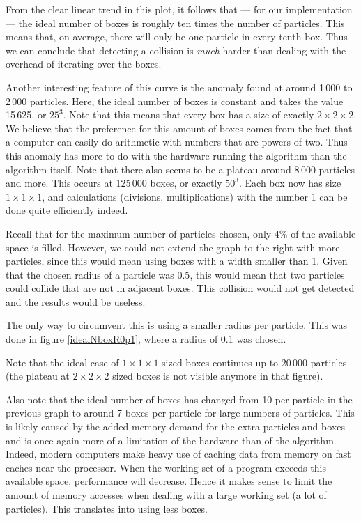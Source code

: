 From the clear linear trend in this plot, it follows that --- for our 
implementation  --- the ideal number of boxes is roughly ten times the 
number of particles. This means that, on average, there will only be one 
particle in every tenth box. Thus we can conclude that detecting a 
collision is \emph{much} harder than dealing with the overhead of iterating 
over the boxes.

Another interesting feature of this curve is the anomaly found at around 1\,000 
to 2\,000 particles. Here, the ideal number of boxes is constant and takes the 
value 15\,625, or $25^3$. Note that this means that every box has a size of 
exactly $2 \times 2 \times 2$. We believe that the preference for this amount 
of boxes comes from the fact that a computer can easily do arithmetic with 
numbers that are powers of two. Thus this anomaly has more to do with the 
hardware running the algorithm than the algorithm itself. Note that there also 
seems to be a plateau around 8\,000 particles and more. This occurs at 125\,000 
boxes, or exactly $50^3$. Each box now has size $1 \times 1 \times 1$, and 
calculations (divisions, multiplications) with the number 1 can be done quite 
efficiently indeed.

Recall that for the maximum number of particles chosen, only 4\% of the 
available space is filled. However, we could not extend the graph to the 
right with more particles, since this would mean using boxes with a width 
smaller than 1. Given that the chosen radius of a particle was $0.5$, this 
would mean that two particles could collide that are not in adjacent boxes.  
This collision would not get detected and the results would be useless.

The only way to circumvent this is using a smaller radius per particle.  This 
was done in figure \ref{idealNboxR0p1}, where a radius of 0.1 was chosen.



Note that the ideal case of $1 \times 1 \times 1$ sized boxes continues up 
to 20\,000 particles (the plateau at $2 \times 2 \times 2$ sized boxes is 
not visible anymore in that figure).

Also note that the ideal number of boxes has changed from 10 per particle 
in the previous graph to around 7 boxes per particle for large numbers of 
particles. This is likely caused by the added memory demand for the extra 
particles and boxes and is once again more of a limitation of the hardware 
than of the algorithm. Indeed, modern computers make heavy use of caching 
data from memory on fast caches near the processor. When the working set of a 
program exceeds this available space, performance will decrease. Hence it makes 
sense to limit the amount of memory accesses when dealing with a large working 
set (a lot of particles). This translates into using less boxes.

